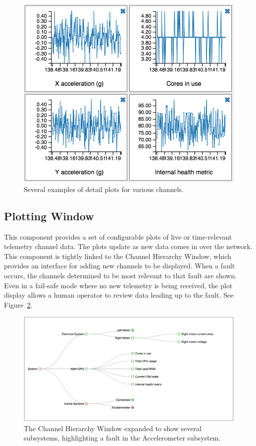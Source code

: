 \documentclass[letterpaper, 10 pt, conference]{ieeeconf}  %
\begin{document}
\begin{figure}[h]
\centering
    \includegraphics[width=\columnwidth]{plots2.png}
    \caption{Several examples of detail plots for various channels.}
    \label{fig:plots}
\end{figure}

\subsection{Plotting Window}

This component provides a set of configurable plots of live or time-relevant telemetry channel data. The plots update as new data comes in over the network. This component is tightly linked to the Channel Hierarchy Window, which provides an interface for adding new channels to be displayed. When a fault occurs, the channels determined to be most relevant to that fault are shown. Even in a fail-safe mode where no new telemetry is being received, the plot display allows a human operator to review data leading up to the fault. See Figure~\ref{fig:hierarchy}.

\begin{figure}
\centering
    \includegraphics[width=\textwidth]{hierarchy2.png}
    \caption{The Channel Hierarchy Window expanded to show several subsystems, highlighting a fault in the Accelerometer subsystem.}
    \label{fig:hierarchy}
\end{figure}
\end{document}
